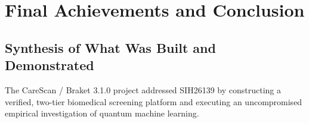 \documentclass[11pt,a4paper]{report}
\begin{document}
\chapter{Final Achievements and Conclusion}

\section{Synthesis of What Was Built and Demonstrated}
The CareScan / Braket 3.1.0 project addressed SIH26139 by constructing a verified, two-tier biomedical screening platform and executing an uncompromised empirical investigation of quantum machine learning.
\end{document}
